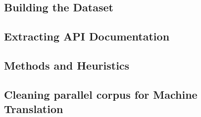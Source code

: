 \subsection{Building the Dataset}

	

\subsection{Extracting API Documentation}

	

\subsection{Methods and Heuristics}

	
	
\subsection{Cleaning parallel corpus for Machine Translation}

    

